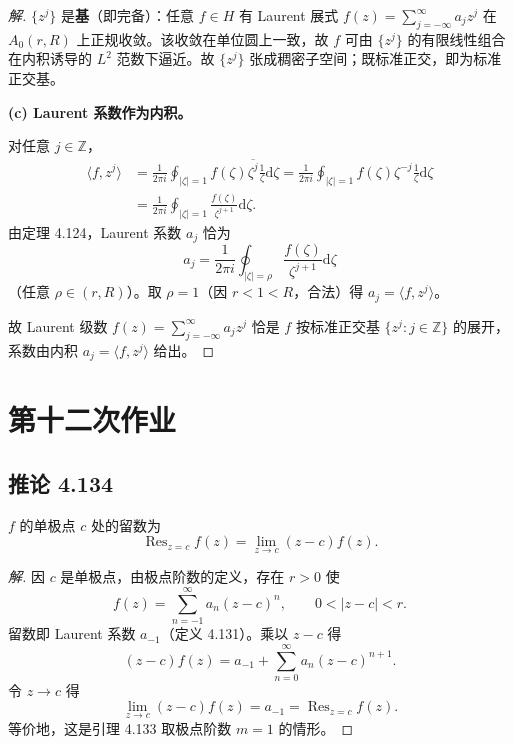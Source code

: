 \documentclass[11pt,a4paper]{article}
\newcommand{\Z}{\mathbb{Z}}
\newcommand{\dd}{\mathrm{d}}
\newcommand{\Res}{\operatorname{Res}}
\theoremstyle{definition}
\newenvironment{solution}{\begin{proof}[解]}{\end{proof}}
\begin{document}
\begin{solution}
  $\{z^j\}$ 是\textbf{基}（即完备）：任意 $f \in H$ 有 Laurent 展式 $f(z) = \sum_{j=-\infty}^{\infty} a_j z^j$ 在 $A_0(r, R)$ 上正规收敛。该收敛在单位圆上一致，故 $f$ 可由 $\{z^j\}$ 的有限线性组合在内积诱导的 $L^2$ 范数下逼近。故 $\{z^j\}$ 张成稠密子空间；既标准正交，即为标准正交基。

  \medskip
  \textbf{(c) Laurent 系数作为内积。}

  对任意 $j \in \Z$，
  \begin{align*}
    \langle f, z^j \rangle
    &= \frac{1}{2\pi i} \oint_{|\zeta|=1} f(\zeta) \overline{\zeta^j}
    \frac{1}{\zeta} \dd\zeta
    = \frac{1}{2\pi i} \oint_{|\zeta|=1} f(\zeta) \zeta^{-j}
    \frac{1}{\zeta} \dd\zeta\\
    &= \frac{1}{2\pi i} \oint_{|\zeta|=1}
    \frac{f(\zeta)}{\zeta^{j+1}} \dd\zeta.
  \end{align*}
  由定理 4.124，Laurent 系数 $a_j$ 恰为
  \[
    a_j = \frac{1}{2\pi i} \oint_{|\zeta|=\rho}
    \frac{f(\zeta)}{\zeta^{j+1}} \dd\zeta
  \]
  （任意 $\rho \in (r, R)$）。取 $\rho = 1$（因 $r < 1 < R$，合法）得 $a_j = \langle f, z^j \rangle$。

  故 Laurent 级数 $f(z) = \sum_{j=-\infty}^{\infty} a_j z^j$ 恰是 $f$ 按标准正交基 $\{z^j : j \in \Z\}$ 的展开，系数由内积 $a_j = \langle f, z^j \rangle$ 给出。
\end{solution}

\section{第十二次作业}

\subsection{推论 4.134}

$f$ 的单极点 $c$ 处的留数为
\[
  \Res_{z=c} f(z) = \lim_{z\to c}(z-c)f(z).
\]

\begin{solution}
  因 $c$ 是单极点，由极点阶数的定义，存在 $r>0$ 使
  \[
    f(z)=\sum_{n=-1}^{\infty} a_n(z-c)^n,\qquad 0<|z-c|<r.
  \]
  留数即 Laurent 系数 $a_{-1}$（定义 4.131）。乘以 $z-c$ 得
  \[
    (z-c)f(z)=a_{-1}+\sum_{n=0}^{\infty} a_n(z-c)^{n+1}.
  \]
  令 $z\to c$ 得
  \[
    \lim_{z\to c}(z-c)f(z)=a_{-1}=\Res_{z=c}f(z).
  \]
  等价地，这是引理 4.133 取极点阶数 $m=1$ 的情形。
\end{solution}
\end{document}
